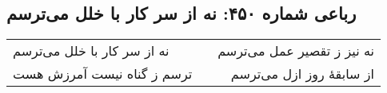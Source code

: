 \begin{center}
\section*{رباعی شماره ۴۵۰: نه از سر کار با خلل می‌ترسم}
\label{sec:sh450}
\begin{longtable}{l p{0.5cm} r}
نه از سر کار با خلل می‌ترسم
&&
نه نیز ز تقصیر عمل می‌ترسم
\\
ترسم ز گناه نیست آمرزش هست
&&
از سابقهٔ روز ازل می‌ترسم
\\
\end{longtable}
\end{center}
